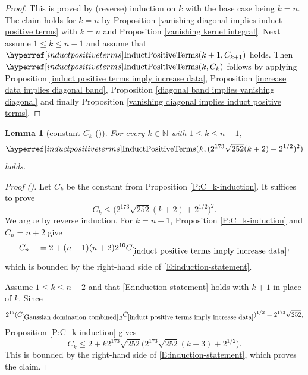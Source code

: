 \documentclass[12pt,reqno]{amsart}
\newcommand{\auto}{{({\tiny\faCar})}}
\theoremstyle{plain}
\newtheorem{lemma}[theorem]{Lemma}
\numberwithin{equation}{section}
\theoremstyle{remark}
\newcommand{\using}[1]{}
\newcommand{\N}{{\mathbb N}}
\newcommand{\ls}[1]{{\color{red}{[L: #1]}}}
\newcommand{\jr}[1]{{\color{orange}{[J: #1]}}}
\begin{document}
\begin{proof}
This is proved by (reverse) induction on $k$ with the base case being $k=n$.
The claim holds for $k=n$ by Proposition \ref{vanishing diagonal implies induct positive terms} with $k=n$ and Proposition \ref{vanishing kernel integral}.
Next assume $1\le k\le n-1$ and assume that $\InductPositiveTerms{k+1,C_{k+1}}$ holds.
Then $\InductPositiveTerms{k,C_k}$
follows by applying Proposition \ref{induct positive terms imply increase data}, Proposition \ref{increase data implies diagonal band}, Proposition \ref{diagonal band implies vanishing diagonal} and finally Proposition \ref{vanishing diagonal implies induct positive terms}.
\end{proof}

\ls{I have improved the constants, so that the final result holds with a constant independent of $n$.}
\jr{Oh, of course, because we only lose $k$ in the $k$th step and this is killed by the square root! So it was there already, I just inefficiently estimated the inducted constant, my bad! Very nice}
\begin{lemma}[constant $C_k$ \auto]\label{P:better-induction}\using{P:C_k-induction}\using{Gaussian domination combined}\using{induct positive terms imply increase data}
For every $k\in\N$ with $1\le k\le n-1$,
\begin{equation}\label{auto:positive-induction-local-bound}
\InductPositiveTerms{k,
(2^{173}\sqrt{252}(k+2)+2^{1/2})^2}
\end{equation}
holds.
\end{lemma}
\begin{proof}[Proof \auto]
Let $C_k$ be the constant from Proposition \ref{P:C_k-induction}. It suffices to prove
\begin{equation}\label{E:induction-statement}
C_k\le
\bigl(2^{173}\sqrt{252}(k+2)+2^{1/2}\bigr)^2.
\end{equation}
We argue by reverse induction. For $k=n-1$, Proposition \ref{P:C_k-induction} and $C_n=n+2$ give
\[
C_{n-1}
=2+(n-1)(n+2)2^{10}C_{\ref{induct positive terms imply increase data}},
\]
which is bounded by the right-hand side of \eqref{E:induction-statement}.

Assume $1\le k\le n-2$ and that \eqref{E:induction-statement} holds with $k+1$ in place of $k$. Since
\[
2^{15}(C_{\ref{Gaussian domination combined},2}C_{\ref{induct positive terms imply increase data}})^{1/2}
=2^{173}\sqrt{252},
\]
Proposition \ref{P:C_k-induction} gives
\[
C_k
\le
2+k2^{173}\sqrt{252}
\bigl(2^{173}\sqrt{252}(k+3)+2^{1/2}\bigr).
\]
This is bounded by the right-hand side of \eqref{E:induction-statement}, which proves the claim.
\end{proof}
\end{document}
